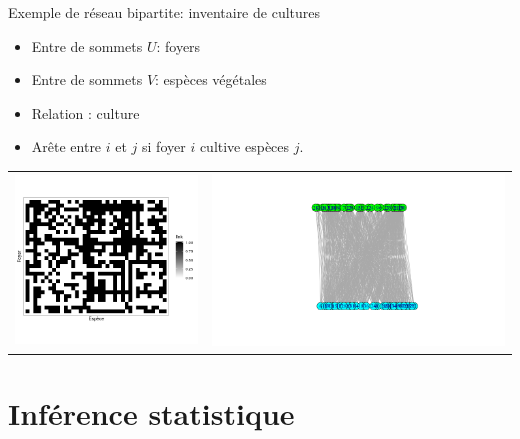 \documentclass[compress,10pt]{beamer}
\begin{document}
\begin{frame}{Exemple de réseau bipartite: inventaire de cultures}

\begin{itemize}
\item  Entre de sommets $U$: foyers
\item  Entre de sommets $V$:  espèces végétales
\item  Relation : culture 
\item Arête entre $i$  et $j$    si foyer $i$ cultive espèces $j$. 
\end{itemize}
 

 \begin{tabular}{cc}
  \includegraphics[width = 5cm]{plots/Vanuatu_incidence.png} &
 \includegraphics[width = 8cm]{plots/Vanuatu_bipartite.png}
\end{tabular}


\end{frame}

\section{Inférence statistique}
\end{document}
